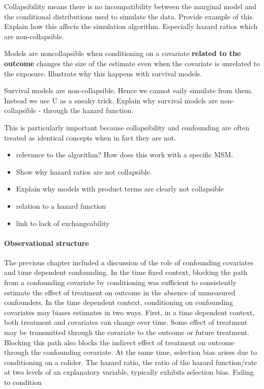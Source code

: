 \documentclass[11pt]{article}
\providecommand{\tightlist}{%
      \setlength{\itemsep}{0pt}\setlength{\parskip}{0pt}}
\begin{document}
Collapsibility means there is no incompatibility between the marginal
model and the conditional distributions used to simulate the data.
Provide example of this. Explain how this affects the simulation
algorithm. Especially hazard ratios which are non-collapsible.

Models are noncollapsible when conditioning on a covariate
\textbf{related to the outcome} changes the size of the estimate even
when the covariate is unrelated to the exposure. Illustrate why this
happens with survival models.

Survival models are non-collapsible. Hence we cannot eaily simulate from
them. Instead we use U as a sneaky trick. Explain why survival models
are non-collapsible - through the hazard function.

This is particularly important because collapsibility and confounding
are often treated as identical concepts when in fact they are not.
\citet{Greenland1999}

\begin{itemize}
\tightlist
\item
  relevance to the algorithm? How does this work with a specific MSM.
\item
  Show why hazard ratios are not collapsible.
\item
  Explain why models with product terms are clearly not collapsible
\item
  relation to a hazard function
\item
  link to lack of exchangeability
\end{itemize}

    \paragraph{Observational structure}\label{observational-structure}

The previous chapter included a discussion of the role of confounding
covariates and time dependent confounding. In the time fixed context,
blocking the path from a confounding covariate by conditioning was
sufficient to consistently estimate the effect of treatment on outcome
in the absence of unmeasured confounders. In the time dependent context,
conditioning on confounding covariates may biases estimates in two ways.
First, in a time dependent context, both treatment and covariates can
change over time. Some effect of treatment may be transmitted through
the covariate to the outcome or future treatment. Blocking this path
also blocks the indirect effect of treatment on outcome through the
confounding covariate. At the same time, selection bias arises due to
conditioning on a colider. The hazard ratio, the ratio of the hazard
function/rate at two levels of an explanatory variable, typically
exhibits selection bias. Failing to condition \linebreak 
\end{document}
